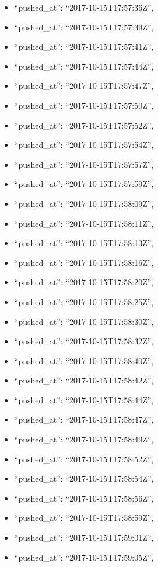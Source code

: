 \begin{itemize}
\item
  ``pushed\_at'': ``2017-10-15T17:57:36Z'',
\item
  ``pushed\_at'': ``2017-10-15T17:57:39Z'',
\item
  ``pushed\_at'': ``2017-10-15T17:57:41Z'',
\item
  ``pushed\_at'': ``2017-10-15T17:57:44Z'',
\item
  ``pushed\_at'': ``2017-10-15T17:57:47Z'',
\item
  ``pushed\_at'': ``2017-10-15T17:57:50Z'',
\item
  ``pushed\_at'': ``2017-10-15T17:57:52Z'',
\item
  ``pushed\_at'': ``2017-10-15T17:57:54Z'',
\item
  ``pushed\_at'': ``2017-10-15T17:57:57Z'',
\item
  ``pushed\_at'': ``2017-10-15T17:57:59Z'',
\item
  ``pushed\_at'': ``2017-10-15T17:58:09Z'',
\item
  ``pushed\_at'': ``2017-10-15T17:58:11Z'',
\item
  ``pushed\_at'': ``2017-10-15T17:58:13Z'',
\item
  ``pushed\_at'': ``2017-10-15T17:58:16Z'',
\item
  ``pushed\_at'': ``2017-10-15T17:58:20Z'',
\item
  ``pushed\_at'': ``2017-10-15T17:58:25Z'',
\item
  ``pushed\_at'': ``2017-10-15T17:58:30Z'',
\item
  ``pushed\_at'': ``2017-10-15T17:58:32Z'',
\item
  ``pushed\_at'': ``2017-10-15T17:58:40Z'',
\item
  ``pushed\_at'': ``2017-10-15T17:58:42Z'',
\item
  ``pushed\_at'': ``2017-10-15T17:58:44Z'',
\item
  ``pushed\_at'': ``2017-10-15T17:58:47Z'',
\item
  ``pushed\_at'': ``2017-10-15T17:58:49Z'',
\item
  ``pushed\_at'': ``2017-10-15T17:58:52Z'',
\item
  ``pushed\_at'': ``2017-10-15T17:58:54Z'',
\item
  ``pushed\_at'': ``2017-10-15T17:58:56Z'',
\item
  ``pushed\_at'': ``2017-10-15T17:58:59Z'',
\item
  ``pushed\_at'': ``2017-10-15T17:59:01Z'',
\item
  ``pushed\_at'': ``2017-10-15T17:59:05Z'',

\end{itemize}
